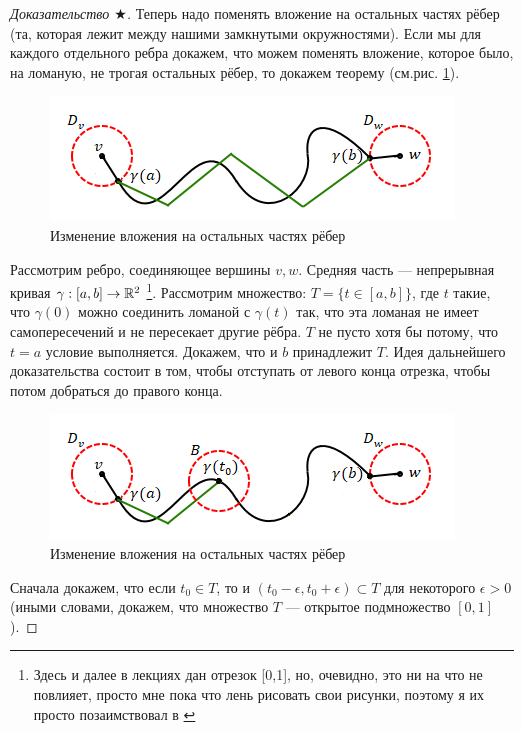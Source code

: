 \begin{proof}[Доказательство $\bigstar$]
    Теперь надо поменять вложение на остальных частях рёбер (та, которая лежит между нашими замкнутыми окружностями). Если мы для каждого отдельного ребра докажем, что можем поменять вложение, которое было, на ломаную, не трогая остальных рёбер, то докажем теорему (см.рис. \ref{fig:c3.7}).

    \begin{figure}[h]
        \centering
        \includegraphics[scale=0.7]{images/c3.7.png}
        \caption{Изменение вложения на остальных частях рёбер}
        \label{fig:c3.7}
    \end{figure}

    Рассмотрим ребро, соединяющее вершины $v, w$. Средняя часть — непрерывная кривая $\gamma: [a,b] \to \mathbb{R}^2$ \footnote{Здесь и далее в лекциях дан отрезок [0,1], но, очевидно, это ни на что не повлияет, просто мне пока что лень рисовать свои рисунки, поэтому я их просто позаимствовал в \cite{oshemkov}}. Рассмотрим множество: $T = \{t \in [a,b]\}$, где $t$ такие, что $\gamma(0)$ можно соединить ломаной с $\gamma(t)$ так, что эта ломаная не имеет самопересечений и не пересекает другие рёбра.
    $T$ не пусто хотя бы потому, что $t = a$ условие выполняется.
    Докажем, что и $b$ принадлежит $T$.
    Идея дальнейшего доказательства состоит в том, чтобы отступать от левого конца отрезка, чтобы потом добраться до правого конца.

    \begin{figure}[h]
        \centering
        \includegraphics[scale=0.7]{images/c3.8.png}
        \caption{Изменение вложения на остальных частях рёбер}
        \label{fig:c3.8}
    \end{figure}

    Сначала докажем, что если $t_0 \in T$, то и $(t_0 - \epsilon, t_0 + \epsilon) \subset T$ для некоторого $\epsilon > 0$ (иными словами, докажем, что множество $T$ — открытое подмножество $[0,1]$).


\end{proof}
